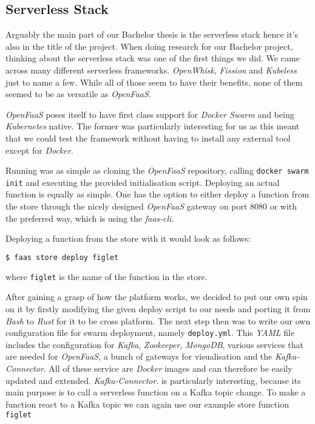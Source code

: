 \subsection{Serverless Stack}

Arguably the main part of our Bachelor thesis is the serverless stack hence it's also in the title
of the project. When doing research for our Bachelor project, thinking about the serverless stack
was one of the first things we did. We came across many different serverless frameworks.
\textit{OpenWhisk}, \textit{Fission} and \textit{Kubeless} just to name a few. While all of those
seem to have their benefits, none of them seemed to be as versatile as \textit{OpenFaaS}.

\textit{OpenFaaS} poses itself to have first class support for \textit{Docker Swarm} and being
\textit{Kubernetes} native. The former was particularly interesting for us as this meant that we
could test the framework without having to install any external tool except for  \textit{Docker}.

Running was as simple as cloning the \textit{OpenFaaS} repository, calling \texttt{docker swarm
init} and executing the provided initialisation script. Deploying an actual function is equally as
simple. One has the option to either deploy a function from the store through the nicely designed
\textit{OpenFaaS} gateway on port 8080 or with the preferred way, which is using the
\textit{faas-cli}.

Deploying a function from the store with it would look as follows:

\begin{lstlisting}[language=bash]
  $ faas store deploy figlet
\end{lstlisting}

where \texttt{figlet} is the name of the function in the store.

After gaining a grasp of how the platform works, we decided to put our own spin on it by firstly
modifying the given deploy script to our needs and porting it from \textit{Bash} to \textit{Rust}
for it to be cross platform. The next step then was to write our own configuration file for swarm
deployment, namely \texttt{deploy.yml}. This \textit{YAML} file includes the configuration for
\textit{Kafka}, \textit{Zookeeper}, \textit{MongoDB}, various services that are needed for
\textit{OpenFaaS}, a bunch of gateways for visualisation and the \textit{Kafka-Connector}. All of
these service are \textit{Docker} images and can therefore be easily updated and extended.
\textit{Kafka-Connector}. is particularly interesting, because its main purpose is to call a
serverless function on a Kafka topic change. To make a function react to a Kafka topic we can again
use our example store function \texttt{figlet}

